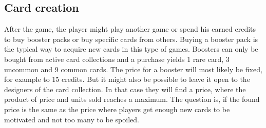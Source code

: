 \documentclass{article}
\begin{document}
\subsection{Card creation}
%
After the game, the player might play another game or spend his earned credits to buy booster packs or buy specific cards from others. Buying a booster pack is the typical way to acquire new cards in this type of games. Boosters can only be bought from active card collections and a purchase yields 1 rare card, 3 uncommon and 9 common cards. The price for a booster will most likely be fixed, for example to 15 credits. But it might also be possible to leave it open to the designers of the card collection. In that case they will find a price, where the product of price and units sold reaches a maximum. The question is, if the found price is the same as the price where players get enough new cards to be motivated and not too many to be spoiled.
%
\newline \newline
%
\end{document}
